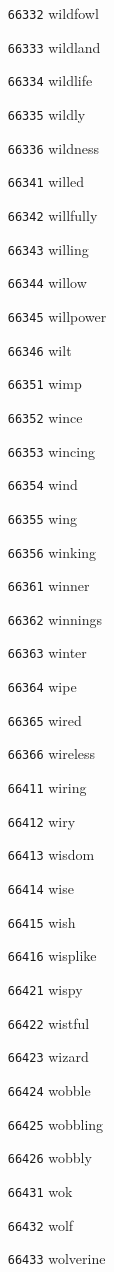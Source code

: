 \documentclass[twoside,11pt]{article}
\begin{document}
\begin{multicols}{5}
\begin{enumerate}
\item[\texttt{66332}] wildfowl
\item[\texttt{66333}] wildland
\item[\texttt{66334}] wildlife
\item[\texttt{66335}] wildly
\item[\texttt{66336}] wildness
\item[\texttt{66341}] willed
\item[\texttt{66342}] willfully
\item[\texttt{66343}] willing
\item[\texttt{66344}] willow
\item[\texttt{66345}] willpower
\item[\texttt{66346}] wilt
\item[\texttt{66351}] wimp
\item[\texttt{66352}] wince
\item[\texttt{66353}] wincing
\item[\texttt{66354}] wind
\item[\texttt{66355}] wing
\item[\texttt{66356}] winking
\item[\texttt{66361}] winner
\item[\texttt{66362}] winnings
\item[\texttt{66363}] winter
\item[\texttt{66364}] wipe
\item[\texttt{66365}] wired
\item[\texttt{66366}] wireless
\item[\texttt{66411}] wiring
\item[\texttt{66412}] wiry
\item[\texttt{66413}] wisdom
\item[\texttt{66414}] wise
\item[\texttt{66415}] wish
\item[\texttt{66416}] wisplike
\item[\texttt{66421}] wispy
\item[\texttt{66422}] wistful
\item[\texttt{66423}] wizard
\item[\texttt{66424}] wobble
\item[\texttt{66425}] wobbling
\item[\texttt{66426}] wobbly
\item[\texttt{66431}] wok
\item[\texttt{66432}] wolf
\item[\texttt{66433}] wolverine

\end{enumerate}
\end{multicols}
\end{document}
